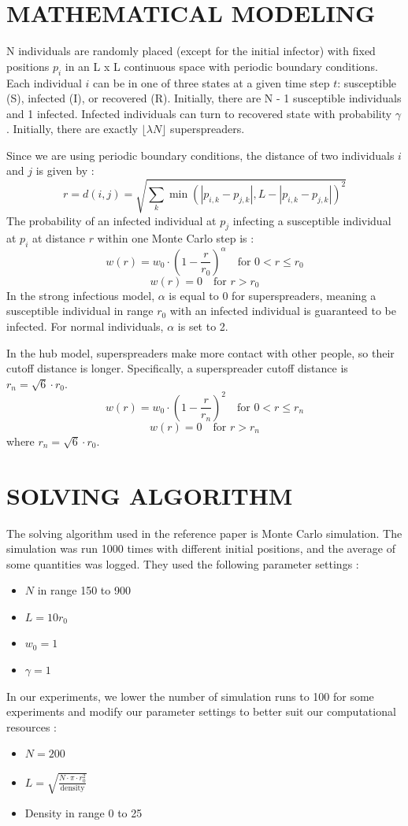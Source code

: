 \documentclass{article}
\begin{document}
\section{MATHEMATICAL MODELING}
\label{sec:mathematical_modeling}
N individuals are randomly placed (except for the initial infector) with fixed positions \(p_i\) in an L x L continuous space with periodic boundary conditions. Each individual \(i\) can be in one of three states at a given time step \(t\): susceptible (S), infected (I), or recovered (R). Initially, there are N - 1 susceptible individuals and 1 infected. Infected individuals can turn to recovered state with probability \(\gamma\). Initially, there are exactly \(\lfloor \lambda N \rfloor\) superspreaders.

Since we are using periodic boundary conditions, the distance of two individuals \(i\) and \(j\) is given by :
\[
r = d(i, j) = \sqrt{\sum_k \min(|p_{i, k} - p_{j, k}|, L - |p_{i, k} - p_{j, k}|)^2}
\]
The probability of an infected individual at \(p_j\) infecting a susceptible individual at \(p_i\) at distance \(r\) within one Monte Carlo step is :
\[
w(r) = w_0 \cdot \left(1 - \frac{r}{r_0}\right)^\alpha \quad \text{for } 0 < r \le r_0
\]
\[
w(r) = 0 \quad \text{for } r > r_0
\]
In the strong infectious model, \(\alpha\) is equal to 0 for superspreaders, meaning a susceptible individual in range \(r_0\) with an infected individual is guaranteed to be infected. For normal individuals, \(\alpha\) is set to 2.

In the hub model, superspreaders make more contact with other people, so their cutoff distance is longer. Specifically, a superspreader cutoff distance is \(r_n = \sqrt{6} \cdot r_0\).
\[
w(r) = w_0 \cdot \left(1 - \frac{r}{r_n}\right)^2 \quad \text{for } 0 < r \le r_n
\]
\[
w(r) = 0 \quad \text{for } r > r_n
\]
where \(r_n = \sqrt{6} \cdot r_0\).

\section{SOLVING ALGORITHM}
\label{sec:solving_algorithm}
The solving algorithm used in the reference paper is Monte Carlo simulation. The simulation was run 1000 times with different initial positions, and the average of some quantities was logged. They used the following parameter settings :
\begin{itemize}
    \item \(N\) in range 150 to 900
    \item \(L = 10r_0\)
    \item \(w_0 = 1\)
    \item \(\gamma = 1\)
\end{itemize}
In our experiments, we lower the number of simulation runs to 100 for some experiments and modify our parameter settings to better suit our computational resources :
\begin{itemize}
    \item \(N = 200\)
    \item \(L = \sqrt{\frac{N \cdot \pi \cdot r_0^2}{\text{density}}}\)
    \item Density in range 0 to 25
\end{itemize}
\end{document}
